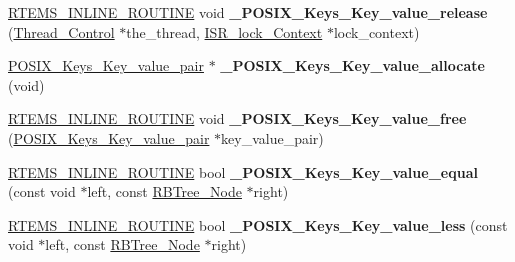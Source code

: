 \begin{DoxyCompactItemize}
\item 
\mbox{\label{group__POSIX__KEY_ga30146f21fd0126de7458649aff234601}} 
\mbox{\hyperlink{group__RTEMSScoreBaseDefs_gac216239df231d5dbd15e3520b0b9313f}{R\+T\+E\+M\+S\+\_\+\+I\+N\+L\+I\+N\+E\+\_\+\+R\+O\+U\+T\+I\+NE}} void {\bfseries \+\_\+\+P\+O\+S\+I\+X\+\_\+\+Keys\+\_\+\+Key\+\_\+value\+\_\+release} (\mbox{\hyperlink{struct__Thread__Control}{Thread\+\_\+\+Control}} $\ast$the\+\_\+thread, \mbox{\hyperlink{structISR__lock__Context}{I\+S\+R\+\_\+lock\+\_\+\+Context}} $\ast$lock\+\_\+context)
\item 
\mbox{\label{group__POSIX__KEY_ga790a7a15f816d9c7becce14825a5be6e}} 
\mbox{\hyperlink{structPOSIX__Keys__Key__value__pair}{P\+O\+S\+I\+X\+\_\+\+Keys\+\_\+\+Key\+\_\+value\+\_\+pair}} $\ast$ {\bfseries \+\_\+\+P\+O\+S\+I\+X\+\_\+\+Keys\+\_\+\+Key\+\_\+value\+\_\+allocate} (void)
\item 
\mbox{\label{group__POSIX__KEY_ga3877909b2818b8bafe9e18c4fe45f31c}} 
\mbox{\hyperlink{group__RTEMSScoreBaseDefs_gac216239df231d5dbd15e3520b0b9313f}{R\+T\+E\+M\+S\+\_\+\+I\+N\+L\+I\+N\+E\+\_\+\+R\+O\+U\+T\+I\+NE}} void {\bfseries \+\_\+\+P\+O\+S\+I\+X\+\_\+\+Keys\+\_\+\+Key\+\_\+value\+\_\+free} (\mbox{\hyperlink{structPOSIX__Keys__Key__value__pair}{P\+O\+S\+I\+X\+\_\+\+Keys\+\_\+\+Key\+\_\+value\+\_\+pair}} $\ast$key\+\_\+value\+\_\+pair)
\item 
\mbox{\label{group__POSIX__KEY_gae9e089bd142b61308940bce0ff7a9941}} 
\mbox{\hyperlink{group__RTEMSScoreBaseDefs_gac216239df231d5dbd15e3520b0b9313f}{R\+T\+E\+M\+S\+\_\+\+I\+N\+L\+I\+N\+E\+\_\+\+R\+O\+U\+T\+I\+NE}} bool {\bfseries \+\_\+\+P\+O\+S\+I\+X\+\_\+\+Keys\+\_\+\+Key\+\_\+value\+\_\+equal} (const void $\ast$left, const \mbox{\hyperlink{structRBTree__Node}{R\+B\+Tree\+\_\+\+Node}} $\ast$right)
\item 
\mbox{\label{group__POSIX__KEY_ga7d0bfe7fe9518a9de7e29cb9c01e8759}} 
\mbox{\hyperlink{group__RTEMSScoreBaseDefs_gac216239df231d5dbd15e3520b0b9313f}{R\+T\+E\+M\+S\+\_\+\+I\+N\+L\+I\+N\+E\+\_\+\+R\+O\+U\+T\+I\+NE}} bool {\bfseries \+\_\+\+P\+O\+S\+I\+X\+\_\+\+Keys\+\_\+\+Key\+\_\+value\+\_\+less} (const void $\ast$left, const \mbox{\hyperlink{structRBTree__Node}{R\+B\+Tree\+\_\+\+Node}} $\ast$right)
\item 

\end{DoxyCompactItemize}
